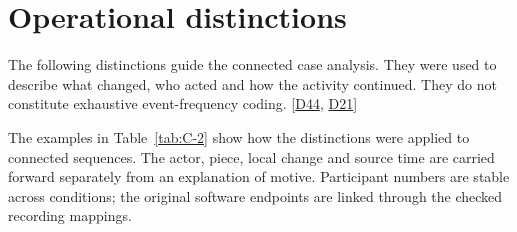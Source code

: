 \chapter{Operational distinctions}\label{chap:C}

The following distinctions guide the connected case analysis. They were used to describe what changed, who acted and how the activity continued. They do not constitute exhaustive event-frequency coding. [\hyperlink{src:D44}{D44}, \hyperlink{src:D21}{D21}]

The examples in Table~\ref{tab:C-2} show how the distinctions were applied to connected sequences. The actor, piece, local change and source time are carried forward separately from an explanation of motive. Participant numbers are stable across conditions; the original software endpoints are linked through the checked recording mappings.


